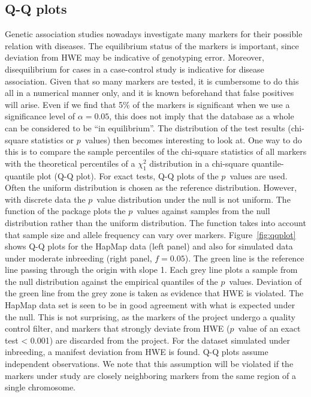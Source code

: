 \documentclass[nojss]{jss}
\begin{document}
\subsection{Q-Q plots}
\label{subsec:q-q}
Genetic association studies nowadays investigate many markers for
their possible relation with diseases. The equilibrium status of the
markers is important, since deviation from HWE may be indicative of
genotyping error. Moreover, disequilibrium for cases in a case-control
study is indicative for disease association. Given that so many
markers are tested, it is cumbersome to do this all in a numerical
manner only, and it is known beforehand that false positives will
arise. Even if we find that 5\% of the markers is significant when we
use a significance level of $\alpha = 0.05$, this does not imply that
the database as a whole can be considered to be ``in
equilibrium''. The distribution of the test results (chi-square
statistics or $p$~values) then becomes interesting to look at. One way
to do this is to compare the sample percentiles of the chi-square
statistics of all markers with the theoretical percentiles of a
$\chi^2_1$ distribution in a chi-square quantile-quantile plot (Q-Q
plot). For exact tests, Q-Q plots of the $p$~values are used.
Often the uniform distribution is chosen as the reference
distribution. However, with discrete data the $p$~value distribution
under the null is not uniform. The function  of the
package plots the $p$~values against samples from the null distribution
rather than the uniform distribution. The function takes into account
that sample size and allele frequency can vary over
markers. Figure~\ref{fig:qqplot} shows Q-Q plots for the HapMap data
(left panel) and also for simulated data under moderate inbreeding
(right panel, $f=0.05$). The green line is the reference line passing
through the origin with slope 1. Each grey line plots a sample from
the null distribution against the empirical quantiles of the
$p$~values. Deviation of the green line from the grey zone is taken as
evidence that HWE is violated. The HapMap data set is seen to be in
good agreement with what is expected under the null. This is not
surprising, as the markers of the project undergo a quality control
filter, and markers that strongly deviate from HWE ($p$~value of an exact
test < 0.001) are discarded from the project. For the dataset
simulated under inbreeding, a manifest deviation from HWE is
found. Q-Q plots assume independent observations. We note that this
assumption will be violated if the markers under study are closely
neighboring markers from the same region of a single chromosome.
\end{document}
